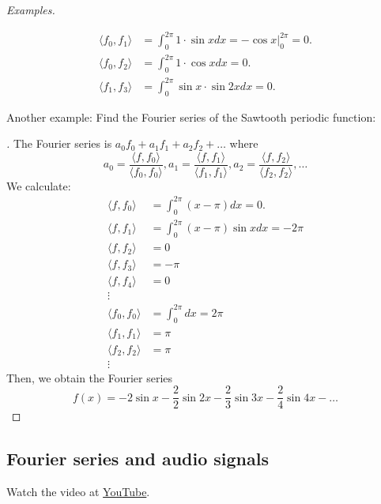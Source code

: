 \documentclass[11pt]{article}
\begin{document}
    \vspace{1em}

    \emph{Examples.}

    \begin{align*}
        \langle f_0, f_1 \rangle &= \int_{0}^{2\pi} 1 \cdot \sin x dx = - \cos x \bigg|_{0}^{2\pi} = 0. \\
        \langle f_0, f_2 \rangle &= \int_{0}^{2\pi} 1 \cdot \cos x dx = 0. \\
        \langle f_1, f_3 \rangle &= \int_{0}^{2\pi} \sin x \cdot \sin 2x dx = 0.
    \end{align*}

    Another example: Find the Fourier series of the Sawtooth periodic function:

    \begin{proof}[\unskip\nopunct]
        The Fourier series is \(a_0 f_0 + a_1 f_1 + a_2 f_2 + \dots\) where \[a_0 = \frac{\langle f, f_0 \rangle}{\langle f_0, f_0 \rangle}, a_1 = \frac{\langle f, f_1 \rangle}{\langle f_1, f_1 \rangle}, a_2 = \frac{\langle f, f_2 \rangle}{\langle f_2, f_2 \rangle}, \dots\] We calculate:
        \begin{align*}
            \langle f, f_0 \rangle &= \int_{0}^{2\pi} (x - \pi) dx = 0. \\
            \langle f, f_1 \rangle & = \int_{0}^{2\pi} (x - \pi) \sin x dx = - 2\pi \\
            \langle f, f_2 \rangle &= 0 \\
            \langle f, f_3 \rangle &= - \pi \\
            \langle f, f_4 \rangle &= 0 \\
            \vdots & \\
            \langle f_0, f_0 \rangle &= \int_{0}^{2\pi} dx = 2\pi \\
            \langle f_1, f_1 \rangle &= \pi \\
            \langle f_2, f_2 \rangle &= \pi \\
            \vdots &
        \end{align*}
        Then, we obtain the Fourier series \[f(x) = - 2 \sin x - \frac{2}{2} \sin 2x - \frac{2}{3} \sin 3x - \frac{2}{4} \sin 4x - \dots\]
    \end{proof}

    \subsection{Fourier series and audio signals}

    Watch the video at \href{https://www.youtube.com/watch?v=3IAMpH4xF9Q}{YouTube}.
\end{document}
